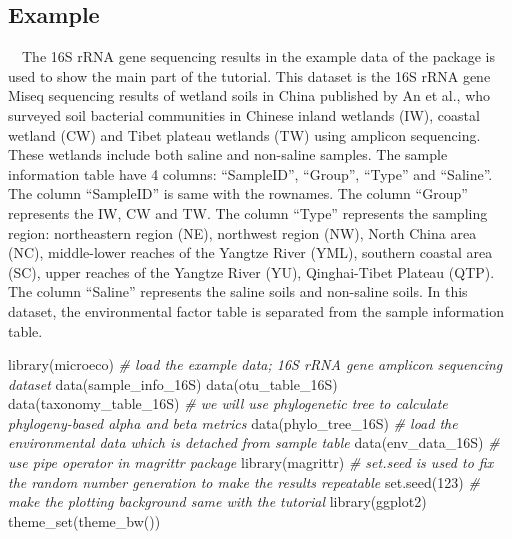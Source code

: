 \documentclass[
]{book}
\newenvironment{Shaded}{\begin{snugshade}}{\end{snugshade}}
\newcommand{\CommentTok}[1]{\textcolor[rgb]{0.56,0.35,0.01}{\textit{#1}}}
\newcommand{\DecValTok}[1]{\textcolor[rgb]{0.00,0.00,0.81}{#1}}
\newcommand{\FunctionTok}[1]{\textcolor[rgb]{0.00,0.00,0.00}{#1}}
\newcommand{\NormalTok}[1]{#1}
\begin{document}
\hypertarget{example}{%
\subsection{Example}\label{example}}

　The 16S rRNA gene sequencing results in the example data of the package is used to show the main part of the tutorial.
This dataset is the 16S rRNA gene Miseq sequencing results of wetland soils in China published by An et al.\citep{An_Soil_2019},
who surveyed soil bacterial communities in Chinese inland wetlands (IW),
coastal wetland (CW) and Tibet plateau wetlands (TW) using amplicon sequencing.
These wetlands include both saline and non-saline samples.
The sample information table have 4 columns: ``SampleID'', ``Group'', ``Type'' and ``Saline''.
The column ``SampleID'' is same with the rownames.
The column ``Group'' represents the IW, CW and TW.
The column ``Type'' represents the sampling region: northeastern region (NE), northwest region (NW), North China area (NC),
middle-lower reaches of the Yangtze River (YML), southern coastal area (SC), upper reaches of the Yangtze River (YU), Qinghai-Tibet Plateau (QTP).
The column ``Saline'' represents the saline soils and non-saline soils.
In this dataset, the environmental factor table is separated from the sample information table.

\begin{Shaded}
\begin{Highlighting}[]
\FunctionTok{library}\NormalTok{(microeco)}
\CommentTok{\# load the example data; 16S rRNA gene amplicon sequencing dataset}
\FunctionTok{data}\NormalTok{(sample\_info\_16S)}
\FunctionTok{data}\NormalTok{(otu\_table\_16S)}
\FunctionTok{data}\NormalTok{(taxonomy\_table\_16S)}
\CommentTok{\# we will use phylogenetic tree to calculate phylogeny{-}based alpha and beta metrics}
\FunctionTok{data}\NormalTok{(phylo\_tree\_16S)}
\CommentTok{\# load the environmental data which is detached from sample table}
\FunctionTok{data}\NormalTok{(env\_data\_16S)}
\CommentTok{\# use pipe operator in magrittr package}
\FunctionTok{library}\NormalTok{(magrittr)}
\CommentTok{\# set.seed is used to fix the random number generation to make the results repeatable}
\FunctionTok{set.seed}\NormalTok{(}\DecValTok{123}\NormalTok{)}
\CommentTok{\# make the plotting background same with the tutorial}
\FunctionTok{library}\NormalTok{(ggplot2)}
\FunctionTok{theme\_set}\NormalTok{(}\FunctionTok{theme\_bw}\NormalTok{())}
\end{Highlighting}
\end{Shaded}
\end{document}
